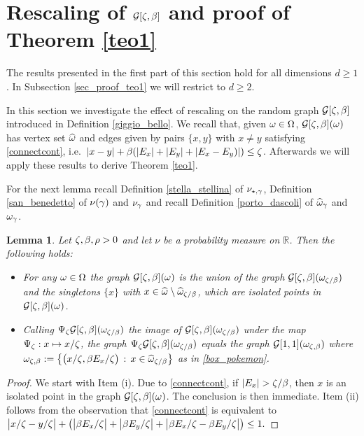 \documentclass[12pt,a4paper,reqno]{amsart}
\newtheorem{Lemma}[Theorem]{Lemma}
\newcommand{\cG}{\ensuremath{\mathcal G}}
\newcommand{\bbR}{{\ensuremath{\mathbb R}} }
\let\O=\Omega \let\P=\Pi   \let\Ps=\Psi \let\Si=\Sigma \let\X=\Xi
\newcommand{\orc}{\textcolor{black}} %
\begin{document}


\section{Rescaling of  $\cG[\z,\b]$ and proof of Theorem \ref{teo1}}\label{escher}

The results presented in the first part of this section hold for all dimensions $d\geq 1$. In Subsection  \ref{sec_proof_teo1} we will restrict to $d\geq 2$.
 
 \smallskip
 
In this section we investigate the effect of rescaling on the random graph $\cG[\z,\b]$ introduced in  Definition \ref{giggio_bello}. We recall that, given $\o\in \O$, 
$\cG[\z,\b](\o)$  has vertex set $\widehat{\omega}$  and edges given by pairs $\{x,y\}$ with $x\not =y$ satisfying 
\eqref{connectcont}, i.e.~$|x-y|+\beta(|E_x|+|E_y|+|E_x-E_y)|)\leq \zeta$. Afterwards we will apply these results to derive  Theorem \ref{teo1}.

\smallskip



For the next \orc{lemma} recall Definition \ref{stella_stellina}  of  $\nu_{\star,\gamma}$, Definition   \ref{san_benedetto} of  $\nu(\gamma)$ and  $\nu_\gamma$ and  
recall Definition \ref{porto_dascoli} of  $\widehat{\omega}_\gamma$ and $\omega_\gamma$.

\begin{Lemma}
\label{fadeev_new}  Let  $\zeta,\beta,\rho >0$  and let $\nu$ be a  probability measure   on $\bbR$.  Then the  following holds:
\begin{itemize}
\item[(i)] For any $\o\in \O$
the graph $\cG[\z, \b](\o)$  is  the  union of the graph
$\cG[\z,\b](\o_{\z/\b})$   and the  singletons $\{x\}$ with  $x\in \widehat {\omega}  \setminus \widehat {\omega}_{\zeta/\beta}$, which are isolated points in $\cG[\z, \b](\o)$. 
\item[(ii)]   
Calling $\Psi_\z \cG[\z,\b] (\o_{\z/\b})   $  the image of $ \cG[\z,\b] (\o_{\z/\b}) $ under the map  $\Psi_\zeta:x\mapsto x/\zeta$, the graph $\Psi_\z \cG[\z,\b] (\o_{\z/\b}) $  equals the graph $\cG[1,1](\o_{\z,\b})$ where  
  $\omega_{\zeta,\beta}:=\left\{ \big (x/\zeta, \beta E_x/\zeta\big) \,: \,  x\in \widehat{\omega}_ {\zeta/\beta} \right \}
  $
  as in \eqref{box_pokemon}.
 \end{itemize}
\end{Lemma}
\begin{proof}
We start with Item (i).
Due to \eqref{connectcont}, if $ |E_x|>\z/\b$, then $x$ is an isolated point in the graph $\cG[\z,\b](\o) $. The conclusion is then immediate. Item
(ii) follows from the observation that \eqref{connectcont} is equivalent to 
$
\big|x/\zeta -y/\zeta\big |+\left(\big|\beta E_x/\zeta \big|+\big|\beta E_y/\zeta\big|+\big| \beta E_x/\zeta-\beta E_y/\zeta\big|\right)\leq 1.$
\end{proof}
\end{document}
